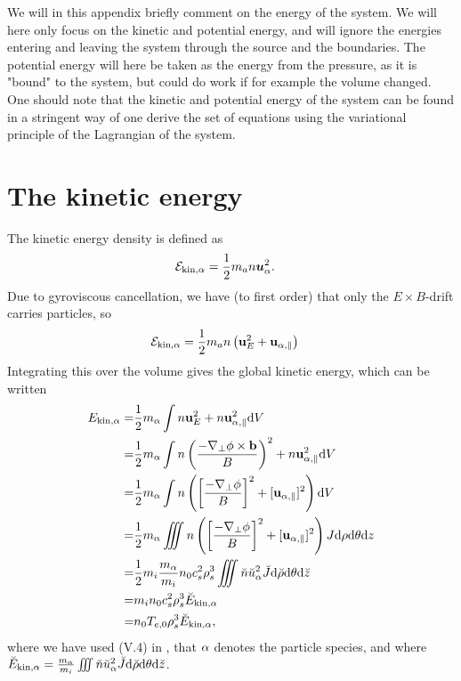 We will in this appendix briefly comment on the energy of the system.
We will here only focus on the kinetic and potential energy, and will ignore the energies entering and leaving the system through the source and the boundaries.
The potential energy will here be taken as the energy from the pressure, as it is "bound" to the system, but could do work if for example the volume changed.
One should note that the kinetic and potential energy of the system can be found in a stringent way of one derive the set of equations using the variational principle of the Lagrangian of the system.

\section{The kinetic energy}
%
The kinetic energy density is defined as
%
\begin{align*}
    \mathcal{E}_{\text{kin},\alpha} &= \frac{1}{2}m_an \boldsymbol{u}^2_\alpha.
\end{align*}
%
Due to gyroviscous cancellation, we have (to first order) that only the $E\times B$-drift carries particles, so
%
\begin{align*}
    \mathcal{E}_{\text{kin},\alpha} &= \frac{1}{2}m_an \left(\mathbf{u}_E^2 + \mathbf{u}_{\alpha,\parallel}\right)
\end{align*}
%
Integrating this over the volume gives the global kinetic energy, which can be written
%
\begin{align*}
    E_{\text{kin},\alpha}
    =& \frac{1}{2}m_{\alpha}\int
       n\mathbf{u}_E^2
       + n\mathbf{u}_{\alpha,\parallel}^2 \text{d} V
     \\
    =& \frac{1}{2}m_{\alpha}\int
       n\left(\frac{-\nabla_\perp\phi
              \times\mathbf{b}}{B}\right)^2
       + n\mathbf{u}_{\alpha,\parallel}^2 \text{d} V
    \\
    =& \frac{1}{2}m_{\alpha}\int
       n\left(\left[\frac{-\nabla_\perp\phi}{B}\right]^2
       + [\mathbf{u}_{\alpha,\parallel}]^2\right) \text{d} V
   \\
    =& \frac{1}{2}m_{\alpha}\iiint
       n\left(\left[\frac{-\nabla_\perp\phi}{B}\right]^2
       + [\mathbf{u}_{\alpha,\parallel}]^2\right)
       J \text{d}\rho \text{d}\theta \text{d} z
    \\
    =& \frac{1}{2}m_i\frac{m_{\alpha}}{m_i}
       n_0c_s^2\rho_s^3
       \iiint
       \breve{n}\breve{u}_\alpha^2
       \breve{J} \text{d} \breve{\rho} \text{d}\theta \text{d} \breve{z}
    \\
    =& m_in_0c_s^2\rho_s^3 \breve{E}_{\text{kin},\alpha}
    \\
    =& n_0T_{e,0}\rho_s^3 \breve{E}_{\text{kin},\alpha},
\end{align*}
%
where we have used (V.4) in \cite{Dhaeseleer1991book}, that $\alpha$ denotes the particle species, and where $\breve{E}_{\text{kin},\alpha} = \frac{m_{\alpha}}{m_i}\iiint \breve{n}\breve{u}_\alpha^2 \breve{J} \text{d} \breve{\rho} \text{d}\theta \text{d} \breve{z}$.

